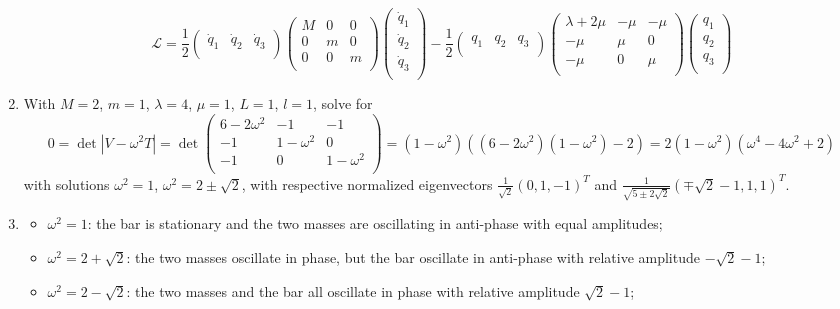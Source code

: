 \documentclass[a4paper]{article}
\begin{document}
\begin{ans}
\begin{enumerate}[label=(\roman*)]
$$\mathcal{L}=\frac{1}{2}\begin{pmatrix}\dot{q}_1&\dot{q}_2&\dot{q}_3\\\end{pmatrix}\begin{pmatrix}M&0&0\\0&m&0\\0&0&m\\\end{pmatrix}\begin{pmatrix}\dot{q}_1\\\dot{q}_2\\\dot{q}_3\\\end{pmatrix}-\frac{1}{2}\begin{pmatrix}q_1&q_2&q_3\\\end{pmatrix}\begin{pmatrix}\lambda+2\mu&-\mu&-\mu\\-\mu&\mu&0\\-\mu&0&\mu\\\end{pmatrix}\begin{pmatrix}q_1\\q_2\\q_3\\\end{pmatrix}$$
\item With $M=2$, $m=1$, $\lambda=4$, $\mu=1$, $L=1$, $l=1$, solve for
$$0=\det|V-\omega^2T|=\det\begin{pmatrix}6-2\omega^2&-1&-1\\-1&1-\omega^2&0\\-1&0&1-\omega^2\\\end{pmatrix}=(1-\omega^2)((6-2\omega^2)(1-\omega^2)-2)=2(1-\omega^2)(\omega^4-4\omega^2+2)$$
with solutions $\omega^2=1$, $\omega^2=2\pm\sqrt{2}$, with respective normalized eigenvectors $\frac{1}{\sqrt{2}}(0,1,-1)^T$ and $\frac{1}{\sqrt{5\pm2\sqrt{2}}}(\mp\sqrt{2}-1,1,1)^T$.
\item 
\begin{itemize}
    \item $\omega^2=1$: the bar is stationary and the two masses are oscillating in anti-phase with equal amplitudes;
    \item $\omega^2=2+\sqrt{2}$: the two masses oscillate in phase, but the bar oscillate in anti-phase with relative amplitude $-\sqrt{2}-1$;
    \item $\omega^2=2-\sqrt{2}$: the two masses and the bar all oscillate in phase with relative amplitude $\sqrt{2}-1$;
\end{itemize}
\end{enumerate}
\end{ans}
\end{document}
